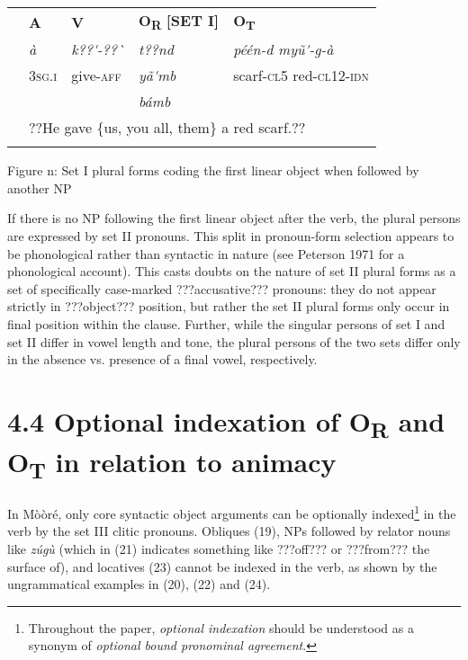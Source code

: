 \documentclass[output=paper]{langsci/langscibook}
\begin{document}
\begin{tabular}{lllll} & \textbf{A} & \textbf{V} & \textbf{O}\textbf{\textsubscript{R}}\textbf{ [SET I]} & \textbf{O}\textbf{\textsubscript{T}}\textbf{ }\\
\lsptoprule
& \textit{à} & \textit{k??\'{ }-??\`{ }} & \textit{t??nd} & \textit{péén-d         myũ\'{ }-g-à}\\
& 3\textsc{sg.i} & give-\textsc{aff} & \textit{yã\'{ }mb} & scarf-\textsc{cl5}    red-\textsc{cl12-idn}\\
&  &  & \textit{bámb} & \\
& \multicolumn{4}{l}{??He gave \{us, you all, them\} a red scarf.??

}\\
\lspbottomrule
\end{tabular}
\begin{styleTabellenberschrift}
\label{bkm:Ref424143970}Figure n: Set I plural forms coding the first linear object when followed by another NP
\end{styleTabellenberschrift}

If there is no NP following the first linear object after the verb, the plural persons are expressed by set II pronouns. This split in pronoun-form selection appears to be phonological rather than syntactic in nature (see Peterson 1971 for a phonological account). This casts doubts on the nature of set II plural forms as a set of specifically case-marked ???accusative??? pronouns: they do not appear strictly in ???object??? position, but rather the set II plural forms only occur in final position within the clause. Further, while the singular persons of set I and set II differ in vowel length and tone, the plural persons of the two sets differ only in the absence vs. presence of a final vowel, respectively. 

\section{4.4 Optional indexation of O\textsubscript{R} and O\textsubscript{T} in relation to animacy}

In Mòòré, only core syntactic object arguments can be optionally indexed\footnote{ Throughout the paper, \textit{optional indexation} should be understood as a synonym of \textit{optional bound pronominal agreement}. }{ }in the verb by the set III clitic pronouns. Obliques (19), NPs followed by relator nouns like \emph{zúgù} (which in (21) indicates something like ???off??? or ???from??? the surface of), and locatives (23) cannot be indexed in the verb, as shown by the ungrammatical examples in (20), (22) and (24). 
\end{document}
